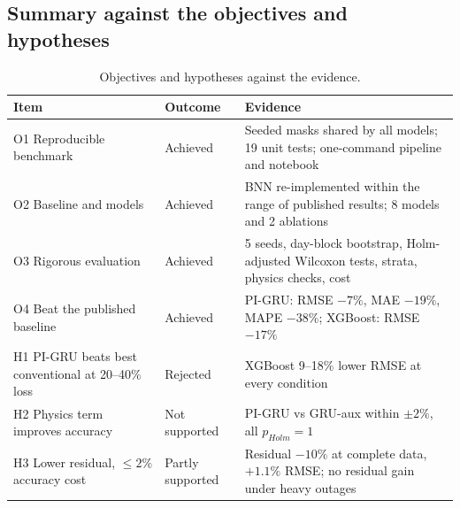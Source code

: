 \subsection{Summary against the objectives and hypotheses}
\begin{table}[H]
\centering\small
\caption{Objectives and hypotheses against the evidence.}\label{tab:objectives}
\begin{tabular}{p{4.6cm}p{2.6cm}p{7.4cm}}
\toprule
Item & Outcome & Evidence \\
\midrule
O1 Reproducible benchmark & Achieved & Seeded masks shared by all models; 19 unit tests; one-command pipeline and notebook \\
O2 Baseline and models & Achieved & BNN re-implemented within the range of published results; 8 models and 2 ablations \\
O3 Rigorous evaluation & Achieved & 5 seeds, day-block bootstrap, Holm-adjusted Wilcoxon tests, strata, physics checks, cost \\
O4 Beat the published baseline & Achieved & PI-GRU: RMSE $-7\%$, MAE $-19\%$, MAPE $-38\%$; XGBoost: RMSE $-17\%$ \\
H1 PI-GRU beats best conventional at 20--40\% loss & Rejected & XGBoost 9--18\% lower RMSE at every condition \\
H2 Physics term improves accuracy & Not supported & PI-GRU vs GRU-aux within $\pm 2\%$, all $p_{Holm}=1$ \\
H3 Lower residual, $\le 2\%$ accuracy cost & Partly supported & Residual $-10\%$ at complete data, $+1.1\%$ RMSE; no residual gain under heavy outages \\
\bottomrule
\end{tabular}
\end{table}

